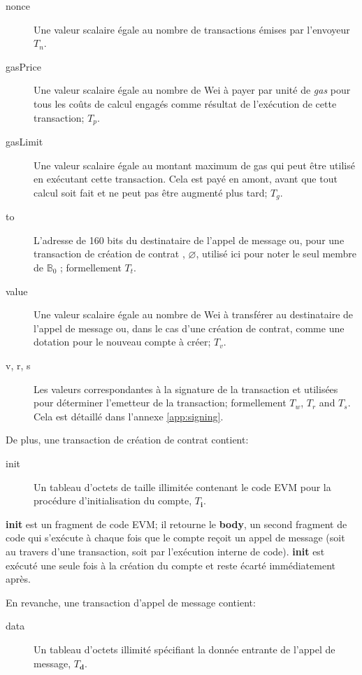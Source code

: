 \documentclass[9pt,oneside]{amsart}
\begin{document}
\begin{multicols}{2}
\begin{description}
\item[nonce] Une valeur scalaire égale au nombre de transactions émises par l'envoyeur $T_n$.
\item[gasPrice] Une valeur scalaire égale au nombre de Wei à payer par unité de \textit{gas} pour tous les coûts de calcul engagés comme résultat de l'exécution de cette transaction; $T_p$.
\item[gasLimit] Une valeur scalaire égale au montant maximum de gas qui peut être utilisé en exécutant cette transaction. Cela est payé en amont, avant que tout calcul soit fait et ne peut pas être augmenté plus tard; $T_g$.
\item[to] L'adresse de 160 bits du destinataire de l'appel de message ou, pour une transaction de création de contrat , $\varnothing$, utilisé ici pour noter le seul membre de $\mathbb{B}_0$ ; formellement $T_t$.
\item[value] Une valeur scalaire égale au nombre de Wei à transférer au destinataire de l'appel de message ou, dans le cas d'une création de contrat, comme une dotation pour le nouveau compte à créer; $T_v$.
\item[v, r, s] Les valeurs correspondantes à la signature de la transaction et utilisées pour déterminer l'emetteur de la transaction; formellement $T_w$, $T_r$ and $T_s$. Cela est détaillé dans l'annexe \ref{app:signing}.
\end{description}

De plus, une transaction de création de contrat contient:

\begin{description}
\item[init] Un tableau d'octets de taille illimitée contenant le code EVM pour la procédure d'initialisation du compte, $T_\mathbf{i}$.
\end{description}

\textbf{init} est un fragment de code EVM; il retourne le \textbf{body}, un second fragment de code qui s'exécute à chaque fois que le compte reçoit un appel de message (soit au travers d'une transaction, soit par l'exécution interne de code). \textbf{init} est exécuté une seule fois à la création du compte et reste écarté immédiatement après.

En revanche, une transaction d'appel de message contient:

\begin{description}
\item[data] Un tableau d'octets illimité spécifiant la donnée entrante de l'appel de message, $T_\mathbf{d}$.
\end{description}


\end{multicols}
\end{document}
